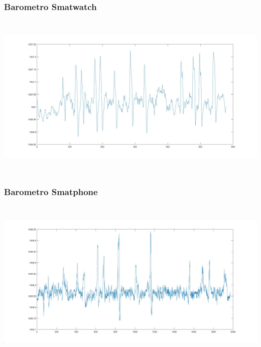\documentclass[a4paper]{article}
\begin{document}
\subsubsection{Barometro Smatwatch\\} 
\begin{minipage}{\linewidth}
\begin{center}
\includegraphics[width=160mm, height= 80mm]{./images/registrazione_tesi/pressure_phone.jpg} 
\end{center}
\end{minipage}
\makebox[\linewidth]{}
\makebox[\linewidth]{}\makebox[\linewidth]{}\makebox[\linewidth]{}
\makebox[\linewidth]{}\makebox[\linewidth]{}\makebox[\linewidth]{}
\makebox[\linewidth]{}\makebox[\linewidth]{}\makebox[\linewidth]{}
\makebox[\linewidth]{}\makebox[\linewidth]{}\makebox[\linewidth]{}

\subsubsection{Barometro Smatphone\\} 
\makebox[\linewidth]{}
\begin{minipage}{\linewidth}
\begin{center}
\includegraphics[width=160mm, height= 80mm]{./images/registrazione_tesi/pressure_watch.jpg} 
\end{center}
\end{minipage}
\end{document}
